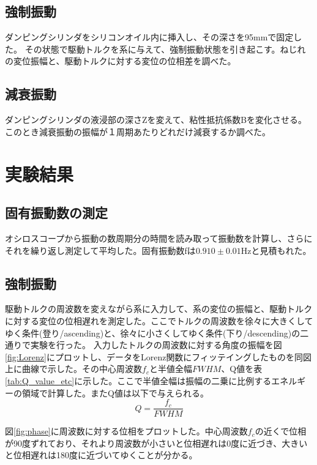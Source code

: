 \documentclass[11pt,a4]{jarticle}
\begin{document}
\subsection{強制振動}
ダンピングシリンダをシリコンオイル内に挿入し、その深さを95mmで固定した。
その状態で駆動トルクを系に与えて、強制振動状態を引き起こす。ねじれの変位振幅と、駆動トルクに対する変位の位相差を調べた。

\subsection{減衰振動}
ダンピングシリンダの液浸部の深さZを変えて、粘性抵抗係数Bを変化させる。
このとき減衰振動の振幅が１周期あたりどれだけ減衰するか調べた。

\section{実験結果}
\subsection{固有振動数の測定}
オシロスコープから振動の数周期分の時間を読み取って振動数を計算し、さらにそれを繰り返し測定して平均した。固有振動数fは$0.910 \pm 0.01$Hzと見積もれた。

\subsection{強制振動}
駆動トルクの周波数を変えながら系に入力して、系の変位の振幅と、駆動トルクに対する変位の位相遅れを測定した。ここでトルクの周波数を徐々に大きくしてゆく条件(登り/ascending)と、徐々に小さくしてゆく条件(下り/descending)の二通りで実験を行った。
入力したトルクの周波数に対する角度の振幅を図\ref{fig:Lorenz}にプロットし、データをLorenz関数にフィッテイングしたものを同図上に曲線で示した。その中心周波数$f_c$と半値全幅$FWHM$、Q値を表\ref{tab:Q_value_etc}に示した。ここで半値全幅は振幅の二乗に比例するエネルギーの領域で計算した。またQ値は以下で与えられる。
\begin{equation}
Q =  \frac{f_c}{FWHM}
\label{eq:Q1}
\end{equation}

図\ref{fig:phase}に周波数に対する位相をプロットした。中心周波数$f_c$の近くで位相が90度ずれており、それより周波数が小さいと位相遅れは0度に近づき、大きいと位相遅れは180度に近づいてゆくことが分かる。
\end{document}
